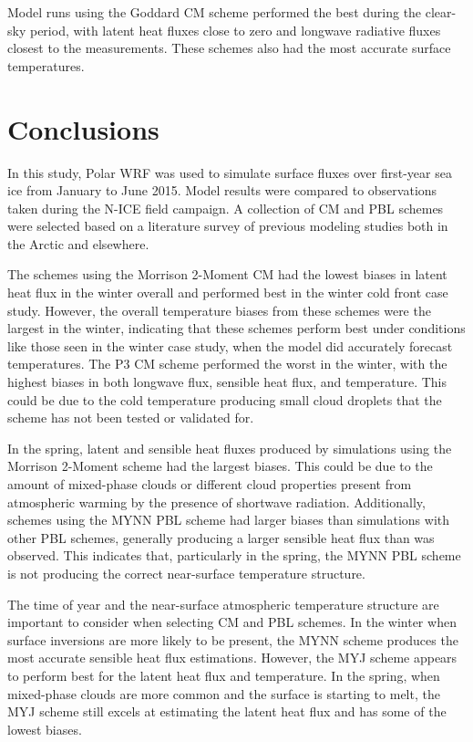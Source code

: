 Model runs using the Goddard CM scheme performed the best during the clear-sky period, with latent heat fluxes close to zero and longwave radiative fluxes closest to the measurements. These schemes also had the most accurate surface temperatures.

\section{Conclusions}
In this study, Polar WRF was used to simulate surface fluxes over first-year sea ice from January to June 2015. Model results were compared to observations taken during the N-ICE field campaign. A collection of CM and PBL schemes were selected based on a literature survey of previous modeling studies both in the Arctic and elsewhere. 

The schemes using the Morrison 2-Moment CM had the lowest biases in latent heat flux in the winter overall and performed best in the winter cold front case study. However, the overall temperature biases from these schemes were the largest in the winter, indicating that these schemes perform best under conditions like those seen in the winter case study, when the model did accurately forecast temperatures. The P3 CM scheme performed the worst in the winter, with the highest biases in both longwave flux, sensible heat flux, and temperature. This could be due to the cold temperature producing small cloud droplets that the scheme has not been tested or validated for. 

In the spring, latent and sensible heat fluxes produced by simulations using the Morrison 2-Moment scheme had the largest biases. This could be due to the amount of mixed-phase clouds or different cloud properties present from atmospheric warming by the presence of shortwave radiation. Additionally, schemes using the MYNN PBL scheme had larger biases than simulations with other PBL schemes, generally producing a larger sensible heat flux than was observed. This indicates that, particularly in the spring, the MYNN PBL scheme is not producing the correct near-surface temperature structure. 

The time of year and the near-surface atmospheric temperature structure are important to consider when selecting CM and PBL schemes. In the winter when surface inversions are more likely to be present, the MYNN scheme produces the most accurate sensible heat flux estimations. However, the MYJ scheme appears to perform best for the latent heat flux and temperature. In the spring, when mixed-phase clouds are more common and the surface is starting to melt, the MYJ scheme still excels at estimating the latent heat flux and has some of the lowest biases. 

